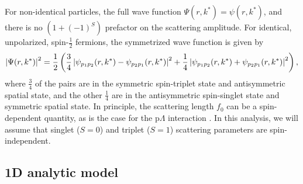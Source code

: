 For non-identical particles, the full wave function $\Psi(r,k^*) = \psi(r,k^*)$, and there is no $(1 + (-1)^S)$ prefactor on the scattering amplitude. 
For identical, unpolarized, spin-$\frac{1}{2}$ fermions, the symmetrized wave function is given by 
\begin{equation}
\label{eq:SymmetrizedWaveFunction}
\left\lvert\Psi(r,k^*)\right\rvert^2 = \frac{1}{2}\left(\frac{3}{4} \left\lvert\psi_{p_1p_2}(r,k^*) - \psi_{p_2p_1}(r,k^*)\right\rvert^2
+ \frac{1}{4} \left\lvert\psi_{p_1p_2}(r,k^*) + \psi_{p_2p_1}(r,k^*)\right\rvert^2\right),
\end{equation}
where $\frac{3}{4}$ of the pairs are in the symmetric spin-triplet state and antisymmetric spatial state, and the other $\frac{1}{4}$ are in the antisymmetric spin-singlet state and symmetric spatial state.
In principle, the scattering length $f_0$ can be a spin-dependent quantity, as is the case for the p$\Lambda$ interaction \cite{Adams:2005ws}.
In this analysis, we will assume that singlet ($S=0$) and triplet ($S=1$) scattering parameters are spin-independent.

\subsection{1D analytic model}
\label{sec:AnalyticModel}

